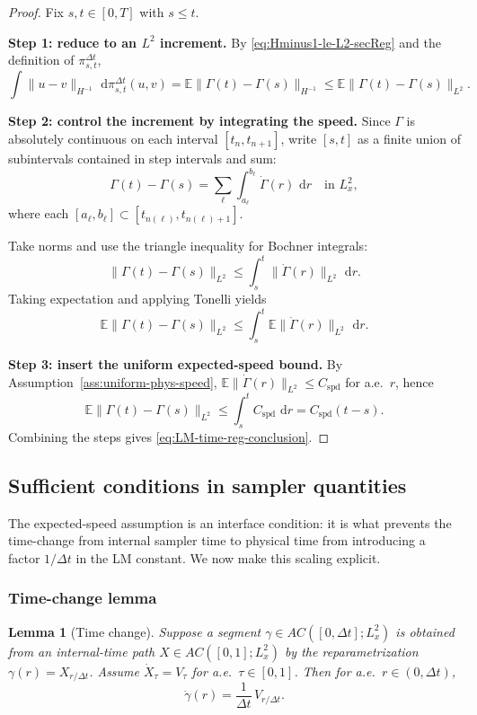 \documentclass{article}
\numberwithin{equation}{section}
\theoremstyle{plain}
\newtheorem{lemma}[theorem]{Lemma}
\theoremstyle{definition}
\theoremstyle{remark}
\newcommand{\E}{\mathbb{E}}
\newcommand{\dd}{\,\mathrm{d}}
\begin{document}
\begin{proof}
Fix $s,t\in[0,T]$ with $s\le t$.

\smallskip
\noindent\textbf{Step 1: reduce to an $L^2$ increment.}
By \eqref{eq:Hminus1-le-L2-secReg} and the definition of $\pi^{\Delta t}_{s,t}$,
\[
\int \|u-v\|_{H^{-1}}\,\dd\pi^{\Delta t}_{s,t}(u,v)
=
\E\|\Gamma(t)-\Gamma(s)\|_{H^{-1}}
\le
\E\|\Gamma(t)-\Gamma(s)\|_{L^2}.
\]

\smallskip
\noindent\textbf{Step 2: control the increment by integrating the speed.}
Since $\Gamma$ is absolutely continuous on each interval $[t_n,t_{n+1}]$,
write $[s,t]$ as a finite union of subintervals contained in step intervals and sum:
\[
\Gamma(t)-\Gamma(s)=\sum_{\ell}\int_{a_\ell}^{b_\ell}\dot\Gamma(r)\,\dd r
\quad\text{in }L^2_x,
\]
where each $[a_\ell,b_\ell]\subset[t_{n(\ell)},t_{n(\ell)+1}]$.

Take norms and use the triangle inequality for Bochner integrals:
\[
\|\Gamma(t)-\Gamma(s)\|_{L^2}\le \int_s^t \|\dot\Gamma(r)\|_{L^2}\,\dd r.
\]
Taking expectation and applying Tonelli yields
\[
\E\|\Gamma(t)-\Gamma(s)\|_{L^2}\le \int_s^t \E\|\dot\Gamma(r)\|_{L^2}\,\dd r.
\]

\smallskip
\noindent\textbf{Step 3: insert the uniform expected-speed bound.}
By Assumption~\ref{ass:uniform-phys-speed},
$\E\|\dot\Gamma(r)\|_{L^2}\le C_{\mathrm{spd}}$ for a.e.\ $r$, hence
\[
\E\|\Gamma(t)-\Gamma(s)\|_{L^2}\le \int_s^t C_{\mathrm{spd}}\,\dd r = C_{\mathrm{spd}}(t-s).
\]
Combining the steps gives \eqref{eq:LM-time-reg-conclusion}.
\end{proof}

\subsection{Sufficient conditions in sampler quantities}

The expected-speed assumption is an interface condition: it is what prevents the time-change from internal sampler time
to physical time from introducing a factor $1/\Delta t$ in the LM constant. We now make this scaling explicit.

\subsubsection{Time-change lemma}

\begin{lemma}[Time change]\label{lem:time-change-speed}
Suppose a segment $\gamma\in AC([0,\Delta t];L^2_x)$ is obtained from an internal-time path
$X\in AC([0,1];L^2_x)$ by the reparametrization $\gamma(r)=X_{r/\Delta t}$.
Assume $\dot X_\tau=V_\tau$ for a.e.\ $\tau\in[0,1]$. Then for a.e.\ $r\in(0,\Delta t)$,
\begin{equation}\label{eq:time-change-derivative-secReg}
\dot\gamma(r)=\frac{1}{\Delta t}\,V_{r/\Delta t}.
\end{equation}
\end{lemma}
\end{document}
